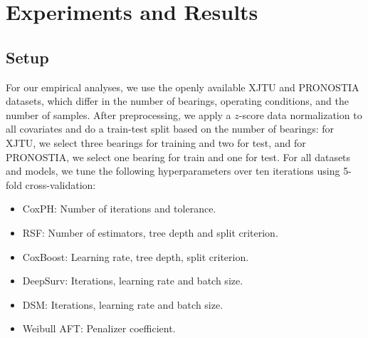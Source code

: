 \documentclass[letterpaper]{article} %
\begin{document}

\section{Experiments and Results}

\subsection{Setup}

For our empirical analyses, we use the openly available XJTU and PRONOSTIA datasets, which differ in the number of bearings, operating conditions, and the number of samples. After preprocessing, we apply a $z$-score data normalization to all covariates and do a train-test split based on the number of bearings: for XJTU, we select three bearings for training and two for test, and for PRONOSTIA, we select one bearing for train and one for test. For all datasets and models, we tune the following hyperparameters over ten iterations using 5-fold cross-validation:

\begin{itemize}
    \item CoxPH: Number of iterations and tolerance.
    \item RSF: Number of estimators, tree depth and split criterion.
    \item CoxBoost: Learning rate, tree depth, split criterion.
    \item DeepSurv: Iterations, learning rate and batch size.
    \item DSM: Iterations, learning rate and batch size.
    \item Weibull AFT: Penalizer coefficient.
\end{itemize}
\end{document}
